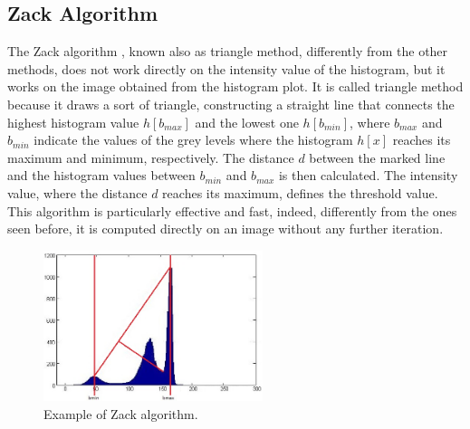 \documentclass[final,a4paper,12pt,english]{UnicaPhdThesis3}
\begin{document}
	\subsection{Zack Algorithm} \label{Zack} %
	The Zack algorithm \cite{Zack}, known also as triangle method, differently from the other methods, does not work directly on the intensity value of the histogram, but it works on the image obtained from the histogram plot. It is called triangle method because it draws a sort of triangle, constructing a straight line that connects the highest histogram value $h[b_{max}]$ and the lowest one $h[b_{min}]$, where $b_{max}$ and $ b_{min}$ indicate the values of the grey levels where the histogram $h[x]$ reaches its maximum and minimum, respectively. The distance $d$ between the marked line and the histogram values between $b_{min}$ and $b_{max}$ is then calculated. The intensity value, where the distance $d$ reaches its maximum, defines the threshold value. This algorithm is particularly effective and fast, indeed, differently from the ones seen before, it is computed directly on an image without any further iteration.
	
	\begin{figure}[!tbp]
		\centering
		\includegraphics[width=0.57\textwidth]{images/Zack}
		\caption{\label{fig:exampleZack}Example of Zack algorithm.}
	\end{figure}
	
\end{document}
